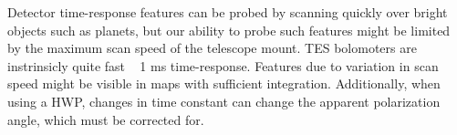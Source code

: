 Detector time-response features can be probed by scanning quickly over bright objects such as planets, but our ability to probe such features might be limited by the maximum scan speed of the telescope mount. TES bolomoters are instrinsicly quite fast ~ 1 ms time-response. Features due to variation in scan speed might be visible in maps with sufficient integration. Additionally, when using a HWP, changes in time constant can change the apparent polarization angle, which must be corrected for.
